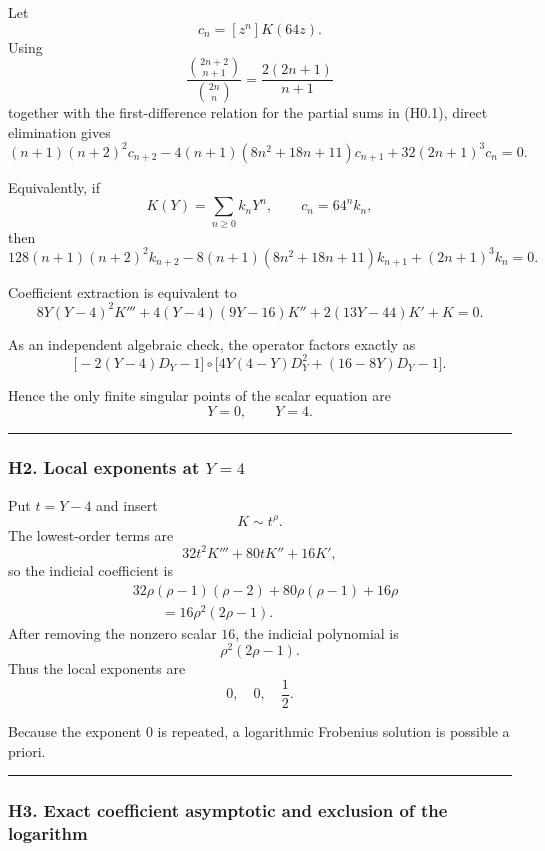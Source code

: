 \documentclass[
  10pt,
  letterpaper,
]{article}
\theoremstyle{definition}
\theoremstyle{remark}
\begin{document}
Let \[
c_n=[z^n]K(64z).
\] Using \[
\frac{\binom{2n+2}{n+1}}{\binom{2n}{n}}
=
\frac{2(2n+1)}{n+1}
\] together with the first-difference relation for the partial sums in
(H0.1), direct elimination gives \[
\boxed{
(n+1)(n+2)^2c_{n+2}
-
4(n+1)(8n^2+18n+11)c_{n+1}
+
32(2n+1)^3c_n
=0.
}
\tag{H1.1}
\]

Equivalently, if \[
K(Y)=\sum_{n\ge0}k_nY^n,
\qquad c_n=64^nk_n,
\] then \[
128(n+1)(n+2)^2k_{n+2}
-
8(n+1)(8n^2+18n+11)k_{n+1}
+
(2n+1)^3k_n
=0.
\tag{H1.2}
\]

Coefficient extraction is equivalent to \[
\boxed{
8Y(Y-4)^2K'''
+4(Y-4)(9Y-16)K''
+2(13Y-44)K'
+K=0.
}
\tag{H1.3}
\]

As an independent algebraic check, the operator factors exactly as \[
\boxed{
\bigl[-2(Y-4)D_Y-1\bigr]
\circ
\bigl[
4Y(4-Y)D_Y^2+(16-8Y)D_Y-1
\bigr].
}
\tag{H1.4}
\]

Hence the only finite singular points of the scalar equation are \[
Y=0,\qquad Y=4.
\]

\begin{center}\rule{0.5\linewidth}{0.5pt}\end{center}

\subsubsection{\texorpdfstring{H2. Local exponents at
\(Y=4\)}{H2. Local exponents at Y=4}}\label{h2.-local-exponents-at-y4}

Put \(t=Y-4\) and insert \[
K\sim t^\rho.
\] The lowest-order terms are \[
32t^2K'''+80tK''+16K',
\] so the indicial coefficient is \[
\begin{aligned}
&32\rho(\rho-1)(\rho-2)
+80\rho(\rho-1)
+16\rho\\
&\qquad=
16\rho^2(2\rho-1).
\end{aligned}
\] After removing the nonzero scalar \(16\), the indicial polynomial is
\[
\boxed{\rho^2(2\rho-1)}.
\] Thus the local exponents are \[
\boxed{0,\quad0,\quad\frac12}.
\]

Because the exponent \(0\) is repeated, a logarithmic Frobenius solution
is possible a priori.

\begin{center}\rule{0.5\linewidth}{0.5pt}\end{center}

\subsubsection{H3. Exact coefficient asymptotic and exclusion of the
logarithm}\label{h3.-exact-coefficient-asymptotic-and-exclusion-of-the-logarithm}
\end{document}
